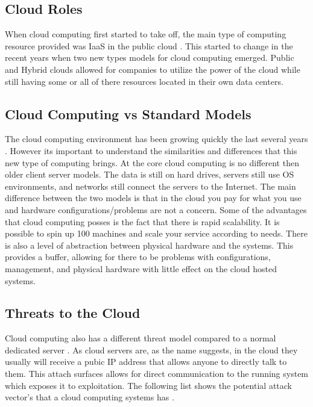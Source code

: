 \documentclass[12pt]{article}
\begin{document}
\subsection{Cloud Roles}
When cloud computing first started to take off, the main type of computing resource provided was IaaS in the public cloud \cite{sourcedigit}. This started to change in the recent years when two new types models for cloud computing emerged. Public and Hybrid clouds allowed for companies to utilize the power of the cloud while still having some or all of there resources located in their own data centers.

\subsection{Cloud Computing vs Standard Models}
The cloud computing environment has been growing quickly the last several years \cite{Vaquero}. However its important to understand the similarities and differences that this new type of computing brings. At the core cloud computing is no different then older client server models. The data is still on hard drives, servers still use OS environments, and networks still connect the servers to the Internet. The main difference between the two models is that in the cloud you pay for what you use and hardware configurations/problems are not a concern. Some of the advantages that cloud computing posses is the fact that there is rapid scalability. It is possible to spin up 100 machines and scale your service according to needs. There is also a level of abstraction between physical hardware and the systems. This provides a buffer, allowing for there to be problems with configurations, management, and physical hardware with little effect on the cloud hosted systems.

\subsection{Threats to the Cloud}
Cloud computing also has a different threat model compared to a normal dedicated server \cite{zissis2012addressing, mishra2013cloud, krutz2010cloud}. As cloud servers are, as the name suggests, in the cloud they usually will receive a pubic IP address that allows anyone to directly talk to them. This attach surfaces allows for direct communication to the running system which exposes it to exploitation. The following list shows the potential attack vector's that a cloud computing systems has \cite{amini2015threat}.
\end{document}
